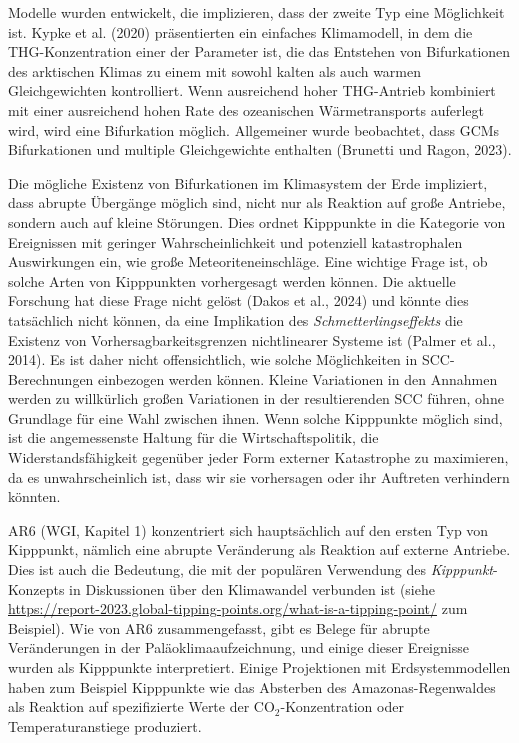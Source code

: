 \documentclass[12pt,paper=a4,DIV=12,parskip=never,chapterprefix=false,headings=standardclasses]{scrreprt}
\begin{document}
Modelle wurden entwickelt, die implizieren, dass der zweite Typ eine Möglichkeit ist. Kypke et al. (2020) präsentierten ein einfaches Klimamodell, in dem die THG-Konzentration einer der Parameter ist, die das Entstehen von Bifurkationen des arktischen Klimas zu einem mit sowohl kalten als auch warmen Gleichgewichten kontrolliert. Wenn ausreichend hoher THG-Antrieb kombiniert mit einer ausreichend hohen Rate des ozeanischen Wärmetransports auferlegt wird, wird eine Bifurkation möglich. Allgemeiner wurde beobachtet, dass GCMs Bifurkationen und multiple Gleichgewichte enthalten (Brunetti und Ragon, 2023).

Die mögliche Existenz von Bifurkationen im Klimasystem der Erde impliziert, dass abrupte Übergänge möglich sind, nicht nur als Reaktion auf große Antriebe, sondern auch auf kleine Störungen. Dies ordnet Kipppunkte in die Kategorie von Ereignissen mit geringer Wahrscheinlichkeit und potenziell katastrophalen Auswirkungen ein, wie große Meteoriteneinschläge. Eine wichtige Frage ist, ob solche Arten von Kipppunkten vorhergesagt werden können. Die aktuelle Forschung hat diese Frage nicht gelöst (Dakos et al., 2024) und könnte dies tatsächlich nicht können, da eine Implikation des \emph{Schmetterlingseffekts} die Existenz von Vorhersagbarkeitsgrenzen nichtlinearer Systeme ist (Palmer et al., 2014). Es ist daher nicht offensichtlich, wie solche Möglichkeiten in SCC-Berechnungen einbezogen werden können. Kleine Variationen in den Annahmen werden zu willkürlich großen Variationen in der resultierenden SCC führen, ohne Grundlage für eine Wahl zwischen ihnen. Wenn solche Kipppunkte möglich sind, ist die angemessenste Haltung für die Wirtschaftspolitik, die Widerstandsfähigkeit gegenüber jeder Form externer Katastrophe zu maximieren, da es unwahrscheinlich ist, dass wir sie vorhersagen oder ihr Auftreten verhindern könnten.

AR6 (WGI, Kapitel 1) konzentriert sich hauptsächlich auf den ersten Typ von Kipppunkt, nämlich eine abrupte Veränderung als Reaktion auf externe Antriebe. Dies ist auch die Bedeutung, die mit der populären Verwendung des \emph{Kipppunkt}-Konzepts in Diskussionen über den Klimawandel verbunden ist (siehe \url{https://report-2023.global-tipping-points.org/what-is-a-tipping-point/} zum Beispiel). Wie von AR6 zusammengefasst, gibt es Belege für abrupte Veränderungen in der Paläoklimaaufzeichnung, und einige dieser Ereignisse wurden als Kipppunkte interpretiert. Einige Projektionen mit Erdsystemmodellen haben zum Beispiel Kipppunkte wie das Absterben des Amazonas-Regenwaldes als Reaktion auf spezifizierte Werte der CO$_2$-Konzentration oder Temperaturanstiege produziert.
\end{document}
